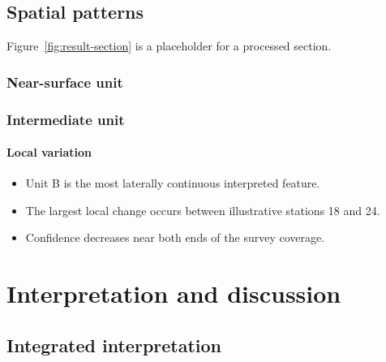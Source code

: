 \documentclass{erp-report}
\begin{document}
\section{Spatial patterns}
Figure~\ref{fig:result-section} is a placeholder for a processed section.
\lipsum[10]

\begin{reportfigure}
  \caption{Illustrative processed profile. A final figure should include
    units, axes, scale, orientation, processing notes, and uncertainty.}
  \label{fig:result-section}
\end{reportfigure}

\subsection{Near-surface unit}
\lipsum[11]

\subsection{Intermediate unit}
\lipsum[12]

\subsubsection{Local variation}
\lipsum[13]

\begin{keyfindings}
  \begin{itemize}
    \item Unit B is the most laterally continuous interpreted feature.
    \item The largest local change occurs between illustrative stations 18
      and 24.
    \item Confidence decreases near both ends of the survey coverage.
  \end{itemize}
\end{keyfindings}

\chapter{Interpretation and discussion}

\section{Integrated interpretation}
\lipsum[14-15]
\end{document}
